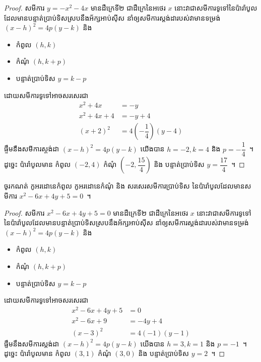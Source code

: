 \begin{proof}
	សមីការ $ y=-x^2-4x $ មានដឺក្រេទី២ ជាដឺក្រេនៃអថេរ $ x $ នោះវាជាសមីការទូទៅនៃប៉ារ៉ាបូលដែលមានបន្ទាត់ប្រាប់ទិសស្របនឹងអ័ក្សអាប់ស៊ីស នាំឲ្យសមីការស្តង់ដារបស់វាមានទម្រង់ $ (x-h)^2=4p(y-k) $ និង
	\begin{itemize}
		\item កំពូល $ (h,k) $
		\item កំណុំ $ (h,k+p) $
		\item បន្ទាត់ប្រាប់ទិស $ y=k-p $
	\end{itemize}
	ដោយសមីការទូទៅអាចសរសេរជា
	\begin{align*}
	x^2+4x &=-y\\
	x^2+4x+4 &=-y+4\\
	(x+2)^2 &=4\left(-\dfrac{1}{4}\right)(y-4)
	\end{align*}
	ផ្ទឹមនឹងសមីការស្តង់ដា $ (x-h)^2=4p(y-k) $ យើងបាន $ h=-2,k=4 $ និង $ p=-\dfrac{1}{4} $~។ ដូច្នេះ ប៉ារ៉ាបូលមាន​ កំពូល $ (-2,4) $ កំណុំ $ \left(-2,\dfrac{15}{4}\right) $ និង បន្ទាត់ប្រាប់ទិស $ y=\dfrac{17}{4} $~។
\end{proof}
%
\begin{example}
	ចូរកណត់ កូអរដោនេ​កំពូល កូអរដោនេ​កំណុំ និង សរសេរសមីការប្រាប់ទិស នៃប៉ារ៉ាបូលដែលមានសមីការ $ x^2-6x+4y+5=0 $~។
\end{example}
%
\begin{proof}
	សមីការ $ x^2-6x+4y+5=0 $ មានដឺក្រេទី២ ជាដឺក្រេនៃអថេរ $ x $ នោះវាជាសមីការទូទៅនៃប៉ារ៉ាបូលដែលមានបន្ទាត់ប្រាប់ទិសស្របនឹងអ័ក្សអាប់ស៊ីស នាំឲ្យសមីការស្តង់ដារបស់វាមានទម្រង់ $ (x-h)^2=4p(y-k) $ និង
	\begin{itemize}
		\item កំពូល $ (h,k) $
		\item កំណុំ $ (h,k+p) $
		\item បន្ទាត់ប្រាប់ទិស $ y=k-p $
	\end{itemize}
	ដោយសមីការទូទៅអាចសរសេរជា
	\begin{align*}
	x^2-6x+4y+5 &=0\\
	x^2-6x+9 &=-4y+4\\
	(x-3)^2 &=4(-1)(y-1)
	\end{align*}
	ផ្ទឹមនឹងសមីការស្តង់ដា $ (x-h)^2=4p(y-k) $ យើងបាន $ h=3,k=1 $ និង $ p=-1 $~។ ដូច្នេះ ប៉ារ៉ាបូលមាន​ កំពូល $ (3,1) $ កំណុំ $ (3,0) $ និង បន្ទាត់ប្រាប់ទិស $ y=2 $~។
\end{proof}
%
